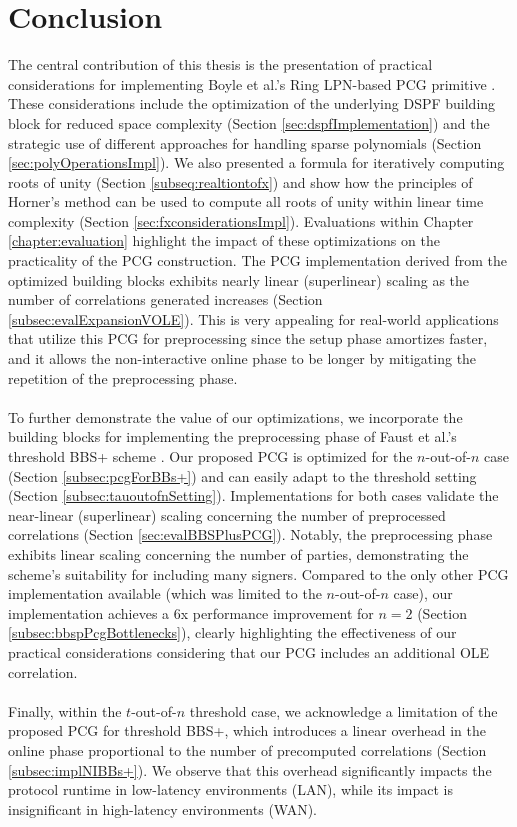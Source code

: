 \chapter{Conclusion}
The central contribution of this thesis is the presentation of practical considerations for implementing Boyle et al.'s Ring LPN-based PCG primitive \cite{boyle2020efficient}. These considerations include the optimization of the underlying DSPF building block for reduced space complexity (Section \ref{sec:dspfImplementation}) and the strategic use of different approaches for handling sparse polynomials (Section \ref{sec:polyOperationsImpl}). We also presented a formula for iteratively computing roots of unity (Section \ref{subseq:realtiontofx}) and show how the principles of Horner's method \cite{horner1819xxi} can be used to compute all roots of unity within linear time complexity (Section \ref{sec:fxconsiderationsImpl}). Evaluations within Chapter \ref{chapter:evaluation} highlight the impact of these optimizations on the practicality of the PCG construction. The PCG implementation derived from the optimized building blocks exhibits nearly linear (superlinear) scaling as the number of correlations generated increases (Section \ref{subsec:evalExpansionVOLE}). This is very appealing for real-world applications that utilize this PCG for preprocessing since the setup phase amortizes faster, and it allows the non-interactive online phase to be longer by mitigating the repetition of the preprocessing phase.
\\\\
To further demonstrate the value of our optimizations, we incorporate the building blocks for implementing the preprocessing phase of Faust et al.'s threshold BBS+ scheme \cite{cryptoeprint:2023/1076}. Our proposed PCG is optimized for the $n$-out-of-$n$ case (Section \ref{subsec:pcgForBBs+}) and can easily adapt to the threshold setting (Section \ref{subsec:tauoutofnSetting}). Implementations for both cases validate the near-linear (superlinear) scaling concerning the number of preprocessed correlations (Section \ref{sec:evalBBSPlusPCG}). Notably, the preprocessing phase exhibits linear scaling concerning the number of parties, demonstrating the scheme's suitability for including many signers. Compared to the only other PCG implementation available \cite{abram2022low} (which was limited to the $n$-out-of-$n$ case), our implementation achieves a 6x performance improvement for $n=2$ (Section \ref{subsec:bbspPcgBottlenecks}), clearly highlighting the effectiveness of our practical considerations considering that our PCG includes an additional OLE correlation.
\\\\
Finally, within the $t$-out-of-$n$ threshold case, we acknowledge a limitation of the proposed PCG for threshold BBS+, which introduces a linear overhead in the online phase proportional to the number of precomputed correlations (Section \ref{subsec:implNIBBs+}). We observe that this overhead significantly impacts the protocol runtime in low-latency environments (LAN), while its impact is insignificant in high-latency environments (WAN).

